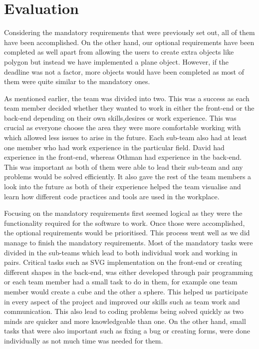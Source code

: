 \documentclass[a4paper]{article}
\begin{document}
	
	\section{Evaluation}
	Considering the mandatory requirements that were previously set out, all of them have been accomplished.
	On the other hand, our optional requirements have been
	completed as well apart from allowing the users to create extra objects like polygon but instead we have implemented a plane object. However, if the deadline was not a factor, more objects would have been completed as most of them were quite similar to the mandatory ones. 
	
	As mentioned earlier, the team was divided into two. This was a success as each team member decided whether they wanted to work in either the front-end or the back-end depending on their own skills,desires or work experience. This was crucial as everyone choose the area they were more comfortable working with which allowed less issues to arise in the future. Each sub-team also had at least one member who had work experience in the particular field. David had experience in the front-end, whereas Othman had experience in the back-end. This was important as both of them were able to lead their sub-team and any problems would be solved efficiently. It also gave the rest of the team members a look into the future as both of their experience helped the team visualise and learn how different code practices and tools are used in the workplace.
	
	Focusing on the mandatory requirements first seemed logical as they were the functionality required for the software to work. Once those were accomplished, the optional requirements would be prioritised. This process went well as we did manage to finish the mandatory requirements. Most of the mandatory tasks were divided in the sub-teams which lead to both individual work and working in pairs. Critical tasks such as SVG implementation on the front-end or creating different shapes in the back-end, was either developed through pair programming or each team member had a small task to do in them, for example one team member would create a cube and the other a sphere. This helped us participate in every aspect of the project and improved our skills such as  team work and communication. This also lead to  coding problems being solved quickly as two minds are quicker and more knowledgeable than one. On the other hand, small tasks that were also important such as fixing a bug or creating forms, were done individually as not much time was needed for them. 
	
\end{document}
